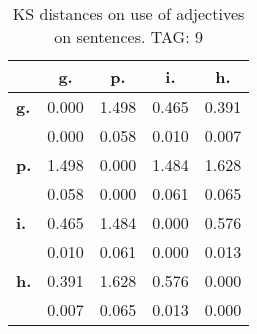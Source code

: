 \begin{table}[h!]
\begin{center}
\begin{tabular}{| l || c | c | c | c |}\hline
 & {\bf g.} & {\bf p.} & {\bf i.} & {\bf h.} \\\hline\hline
{\bf g.} & 0.000 & 1.498 & 0.465 & 0.391 \\
{\bf } & 0.000 & 0.058 & 0.010 & 0.007 \\\hline
{\bf p.} & 1.498 & 0.000 & 1.484 & 1.628 \\
{\bf } & 0.058 & 0.000 & 0.061 & 0.065 \\\hline
{\bf i.} & 0.465 & 1.484 & 0.000 & 0.576 \\
{\bf } & 0.010 & 0.061 & 0.000 & 0.013 \\\hline
{\bf h.} & 0.391 & 1.628 & 0.576 & 0.000 \\
{\bf } & 0.007 & 0.065 & 0.013 & 0.000 \\\hline
\end{tabular}
\caption{KS distances on use of adjectives on sentences. TAG: 9}
\end{center}
\end{table}